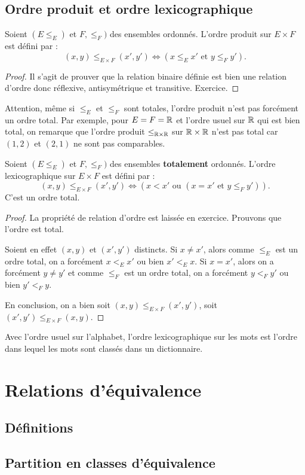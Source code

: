 \subsection{Ordre produit et ordre lexicographique}

\begin{propdef}
Soient $(E\leq_E)$ et $F,\leq_F)$ des ensembles ordonnés.
L'ordre produit sur $E\times F$ est défini par :
\[
(x,y) \leq_{E\times F} (x',y') \iff \left(x\leq_E x' \text{ et } y\leq_F y'\right).
\]
\end{propdef}
\begin{proof}
Il s'agit de prouver que la relation binaire définie est bien une relation d'ordre donc réflexive, antisymétrique et transitive. Exercice.
\end{proof}

Attention, même si $\leq_E$ et $\leq_F$ sont totales, l'ordre produit n'est pas forcément un ordre total. Par exemple, pour $E=F=\mathbb{R}$ et l'ordre usuel sur $\mathbb{R}$ qui est bien total, on remarque que l'ordre produit $\leq_{\mathbb{R}\times\mathbb{R}}$ sur $\mathbb{R}\times \mathbb{R}$ n'est pas total car $(1,2)$ et $(2,1)$ ne sont pas comparables.

\begin{propdef}
Soient $(E\leq_E)$ et $F,\leq_F)$ des ensembles \textbf{totalement} ordonnés.
L'ordre lexicographique sur $E\times F$ est défini par :
\[
(x,y) \leq_{E\times F} (x',y') \iff \left(x< x' \text{ ou } (x=x' \text{ et } y\leq_F y')\right).
\]
C'est un ordre total.
\end{propdef}
\begin{proof}
La propriété de relation d'ordre est laissée en exercice. Prouvons que l'ordre est total.

Soient en effet $(x,y)$ et $(x',y')$ distincts.
Si $x\neq x'$, alors comme $\leq_E$ est un ordre total, on a forcément $x<_E x'$ ou bien $x'<_E x$.
Si $x=x'$, alors on a forcément $y\neq y'$ et comme $\leq_F$ est un ordre total, on a forcément $y <_F y'$ ou bien $y'<_F y$.

En conclusion, on a bien soit $(x,y) \leq_{E\times F} (x',y')$, soit  $(x',y') \leq_{E\times F} (x,y)$.
\end{proof}

\begin{exemple}Avec l'ordre usuel sur l'alphabet, l'ordre lexicographique sur les mots est l'ordre dans lequel les mots sont classés dans un dictionnaire.
\end{exemple}



\section{Relations d'équivalence}

\subsection{Définitions}

\subsection{Partition en classes d'équivalence}